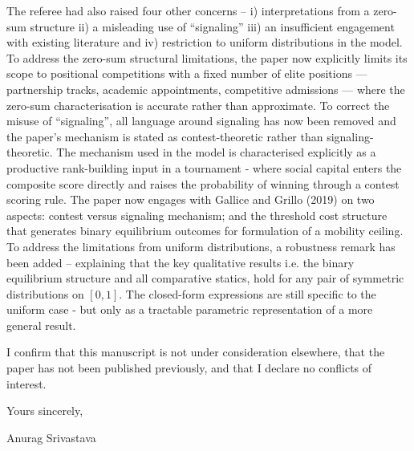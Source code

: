 \documentclass[11pt]{article}
\begin{document}
The referee had also raised four other concerns -- i) interpretations from a zero-sum structure ii) a misleading use of ``signaling'' iii) an insufficient engagement with existing literature and iv) restriction to uniform distributions in the model. To address the zero-sum structural limitations, the paper now explicitly limits its scope to positional competitions with a fixed number of elite positions ---
partnership tracks, academic appointments, competitive admissions
--- where the zero-sum characterisation is accurate rather than
approximate. To correct the misuse of ``signaling'', all language around signaling has now been removed and the paper's mechanism is stated as contest-theoretic rather than signaling-theoretic. The mechanism used in the model is characterised explicitly as a productive rank-building input in a tournament - where social capital enters the composite score directly and raises the probability of winning through a contest scoring rule. The paper now engages with Gallice and Grillo (2019) on two aspects: contest versus signaling mechanism; and the threshold cost structure that generates binary
equilibrium outcomes for formulation of a mobility ceiling. To address the limitations from uniform distributions, a robustness remark has been added -- explaining that the key qualitative results i.e. the binary equilibrium structure and all comparative statics, hold for any pair of symmetric distributions on $[0,1]$. The
closed-form expressions are still specific to the uniform case - but only as a 
tractable parametric representation of a more general result.


I confirm that this manuscript is not under consideration
elsewhere, that the paper has not been published previously,
and that I declare no conflicts of interest.

\bigskip
\noindent
Yours sincerely,

\bigskip
\noindent
Anurag Srivastava\\
\end{document}
